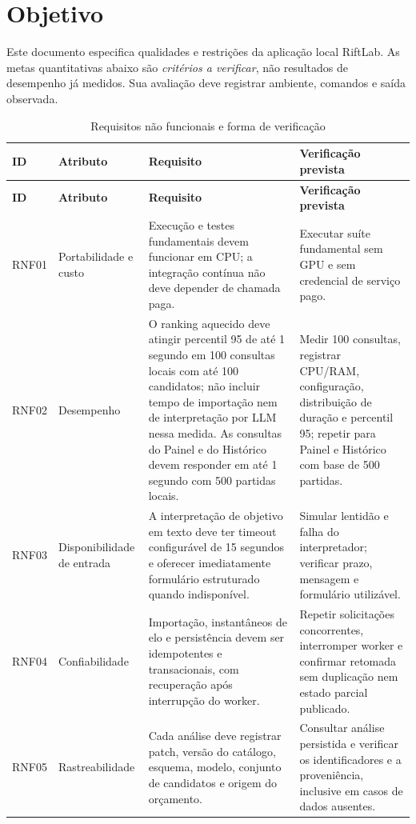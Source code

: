 \documentclass[12pt,a4paper]{article}
\begin{document}
\section{Objetivo}
Este documento especifica qualidades e restrições da aplicação local RiftLab. As metas
quantitativas abaixo são \emph{critérios a verificar}, não resultados de desempenho já
medidos. Sua avaliação deve registrar ambiente, comandos e saída observada.

\small
\begin{longtable}{@{}p{1.25cm}p{3.6cm}p{5.6cm}p{4.3cm}@{}}
\caption{Requisitos não funcionais e forma de verificação}\label{tab:rnf}\\
\toprule
\bfseries ID & \bfseries Atributo & \bfseries Requisito & \bfseries Verificação prevista \\
\midrule
\endfirsthead
\toprule
\bfseries ID & \bfseries Atributo & \bfseries Requisito & \bfseries Verificação prevista \\
\midrule
\endhead
\bottomrule
\endfoot
RNF01 & Portabilidade e custo & Execução e testes fundamentais devem funcionar em CPU; a integração contínua não deve depender de chamada paga. & Executar suíte fundamental sem GPU e sem credencial de serviço pago. \\
RNF02 & Desempenho & O ranking aquecido deve atingir percentil 95 de até 1 segundo em 100 consultas locais com até 100 candidatos; não incluir tempo de importação nem de interpretação por LLM nessa medida. As consultas do Painel e do Histórico devem responder em até 1 segundo com 500 partidas locais. & Medir 100 consultas, registrar CPU/RAM, configuração, distribuição de duração e percentil 95; repetir para Painel e Histórico com base de 500 partidas. \\
RNF03 & Disponibilidade de entrada & A interpretação de objetivo em texto deve ter timeout configurável de 15 segundos e oferecer imediatamente formulário estruturado quando indisponível. & Simular lentidão e falha do interpretador; verificar prazo, mensagem e formulário utilizável. \\
RNF04 & Confiabilidade & Importação, instantâneos de elo e persistência devem ser idempotentes e transacionais, com recuperação após interrupção do worker. & Repetir solicitações concorrentes, interromper worker e confirmar retomada sem duplicação nem estado parcial publicado. \\
RNF05 & Rastreabilidade & Cada análise deve registrar patch, versão do catálogo, esquema, modelo, conjunto de candidatos e origem do orçamento. & Consultar análise persistida e verificar os identificadores e a proveniência, inclusive em casos de dados ausentes. \\

\end{longtable}
\end{document}
